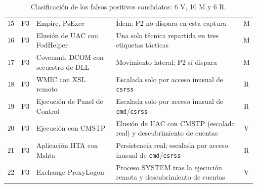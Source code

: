 \begin{table}[H]
\begin{tabularx}{\textwidth}{|r|c|p{4.2cm}|X|c|}
15 & P3 & Empire, PsExec & Ídem; P2 no dispara en esta captura & M \\
16 & P3 & Elusión de UAC con FodHelper & Una sola técnica repartida en tres etiquetas tácticas & M \\
17 & P3 & Covenant, DCOM con secuestro de DLL & Movimiento lateral; P2 sí dispara & M \\
18 & P3 & WMIC con XSL remoto & Escalada solo por acceso inusual de \texttt{csrss} & R \\
19 & P3 & Ejecución de Panel de Control & Escalada solo por acceso inusual de \texttt{cmd}/\texttt{csrss} & R \\
20 & P3 & Ejecución con CMSTP & Elusión de UAC con CMSTP (escalada real) y descubrimiento de cuentas & V \\
21 & P3 & Aplicación HTA con Mshta & Persistencia real; escalada por acceso inusual de \texttt{cmd}/\texttt{csrss} & R \\
22 & P3 & Exchange ProxyLogon & Proceso SYSTEM tras la ejecución remota y descubrimiento de cuentas & V \\
\hline
\end{tabularx}
\caption{Clasificación de los falsos positivos candidatos: 6 V, 10 M y 6 R.}
\label{tab:revision-fp}
\end{table}
